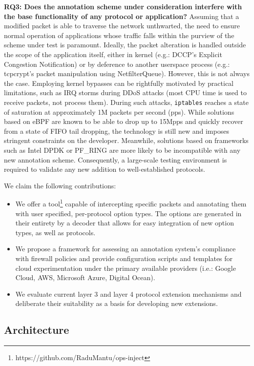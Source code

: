 \textbf{RQ3: Does the annotation scheme under consideration interfere with the base functionality of any protocol or application?}
Assuming that a modified packet is able to traverse the network unthwarted, the need to ensure normal operation of applications whose traffic falls within the purview of the scheme under test is paramount. Ideally, the packet alteration is handled outside the scope of the application itself, either in kernel (e.g.: DCCP's Explicit Congestion Notification) or by deference to another userspace process (e.g.: tcpcrypt's packet manipulation using NetfilterQueue). However, this is not always the case. Employing kernel bypasses can be rightfully motivated by practical limitations, such as IRQ storms during DDoS attacks (most CPU time is used to receive packets, not process them). During such attacks, \texttt{iptables} reaches a state of saturation at approximately 1M packets per second (pps). While solutions based on eBPF are known to be able to drop up to 15Mpps and quickly recover from a state of FIFO tail dropping, the technology is still new and imposes stringent constraints on the developer. Meanwhile, solutions based on frameworks such as Intel DPDK or PF\_RING are more likely to be incompatible with any new annotation scheme. Consequently, a large-scale testing environment is required to validate any new addition to well-established protocols.

We claim the following contributions:
\begin{itemize}
    \item We offer a tool\footnote{https://github.com/RaduMantu/ops-inject} capable of intercepting specific packets and annotating them with user specified, per-protocol option types. The options are generated in their entirety by a decoder that allows for easy integration of new option types, as well as protocols.
    \item We propose a framework for assessing an annotation system's compliance with firewall policies and provide configuration scripts and templates for cloud experimentation under the primary available providers (i.e.: Google Cloud, AWS, Microsoft Azure, Digital Ocean).
    \item We evaluate current layer 3 and layer 4 protocol extension mechanisms and deliberate their suitability as a basis for developing new extensions.
\end{itemize}

\subsection{Architecture}
\label{extend:ops:architecture}

